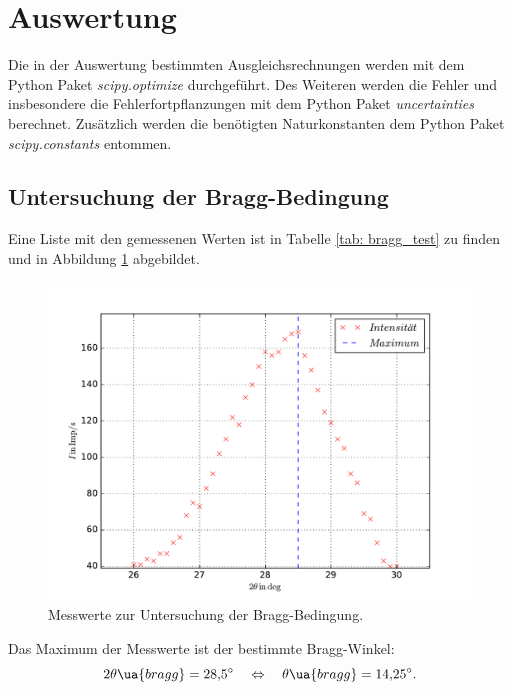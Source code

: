 \section{Auswertung}
Die in der Auswertung bestimmten Ausgleichsrechnungen werden mit
dem Python Paket \emph{scipy.optimize}\cite{scipy} durchgeführt.
Des Weiteren werden die Fehler und insbesondere die Fehlerfortpflanzungen
mit dem Python Paket \emph{uncertainties}\cite{uncertainties} berechnet.
Zusätzlich werden die benötigten Naturkonstanten dem Python Paket \emph{scipy.constants}\cite{scipy}
entommen.

\subsection{Untersuchung der Bragg-Bedingung}
Eine Liste mit den gemessenen Werten ist in Tabelle \ref{tab: bragg_test} zu finden und in Abbildung \ref{fig: bragg_plot} abgebildet.

\begin{figure}
  \centering
  \includegraphics[width=0.8 \textwidth]{../Messdaten/bragbed.pdf}
  \caption{Messwerte zur Untersuchung der Bragg-Bedingung.} %
  \label{fig: bragg_plot}
\end{figure}
Das Maximum der Messwerte ist der bestimmte Bragg-Winkel:
\begin{equation}
  \label{eq:bestimmt_bragg_winkel}
  2\theta\ua{bragg}=\SI{28.5}{\degree} \quad \Leftrightarrow \quad \theta\ua{bragg}=\SI{14.25}{\degree}.
\end{equation}

